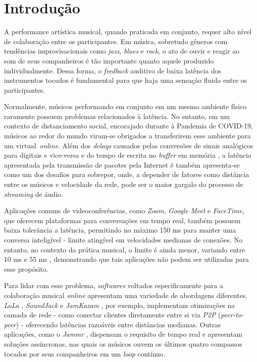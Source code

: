 \chapter{Introdução}

A performance artística musical, quando praticada em conjunto, requer alto nível de colaboração entre os participantes. Em música, sobretudo gêneros com tendências improvisacionais como \textit{jazz}, \textit{blues} e \textit{rock}, o ato de ouvir e reagir ao som de seus companheiros é tão importante quanto aquele produzido individualmente. Dessa forma, o \textit{feedback} auditivo de baixa latência dos instrumentos tocados é fundamental para que haja uma sensação fluida entre os participantes.

Normalmente, músicos performando em conjunto em um mesmo ambiente físico raramente possuem problemas relacionados à latência. No entanto, em um contexto de distanciamento social, encorajado durante à Pandemia de COVID-19, músicos ao redor do mundo viram-se obrigados a transferirem esse ambiente para um virtual \textit{online}. Além dos \textit{delays} causados pelas conversões de sinais analógicos para digitais e vice-versa e do tempo de escrita no \textit{buffer} em memória \cite{how_low_can_you_go}, a latência apresentada pela transmissão de pacotes pela Internet é também apresenta-se como um dos desafios para sobrepor, onde, a depender de fatores como distância entre os músicos e velocidade da rede, pode ser o maior gargalo do processo de \textit{streaming} de áudio.

Aplicações comuns de videoconferências, como \textit{Zoom}, \textit{Google Meet} e \textit{FaceTime}, que oferecem plataformas para conversações em tempo real, também possuem baixa tolerância a latência, permitindo no máximo 150 ms para manter uma conversa inteligível \cite{cisco} - limite atingível em velocidades medianas de conexões. No entanto, no contexto da prática musical, o limite é ainda menor, variando entre 10 ms e 55 ms \cite{mcphearson}, demonstrando que tais aplicações não podem ser utilizadas para esse propósito. 

Para lidar com esse problema, \textit{softwares} voltados especificamente para a colaboração musical \textit{online} apresentam uma variedade de abordagens diferentes. \textit{LoLa} \cite{lola}, \textit{SoundJack} \cite{soundjack} e \textit{JamKazam} \cite{jamkazam}, por exemplo, implementam otimizações na camada de rede - como conectar clientes diretamente entre si via \textit{P2P} (\textit{peer-to-peer}) - oferecendo latências razoáveis entre distâncias medianas. Outras aplicações, como o \textit{Jammr} \cite{jammr}, dispensam o requisito de tempo real e apresentam soluções assíncronas, nas quais os músicos ouvem os últimos quatro compassos tocados por seus companheiros em um \textit{loop} contínuo.

